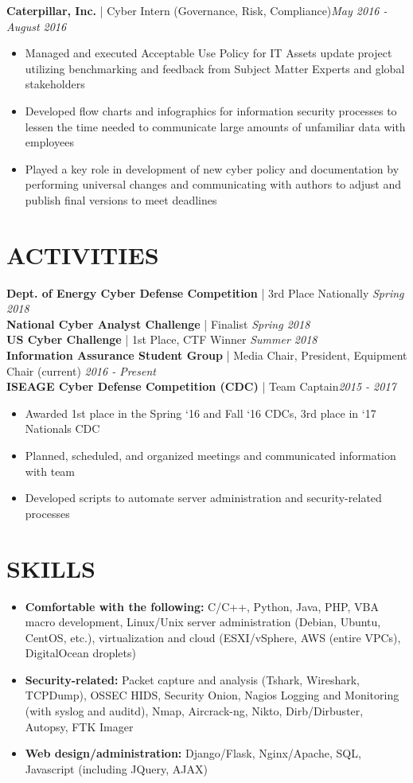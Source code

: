 \documentclass[line]{res}
\begin{document}
\begin{resume}
\textbf{Caterpillar, Inc.} | Cyber Intern (Governance, Risk, Compliance)\hfill \textit{May 2016 - August 2016}
\begin{itemize}
	\item Managed and executed Acceptable Use Policy for IT Assets update project utilizing benchmarking and feedback from Subject Matter Experts and global stakeholders
	\item Developed flow charts and infographics for information security processes to lessen the time needed to communicate large amounts of unfamiliar data with employees
	\item Played a key role in development of new cyber policy and documentation by performing universal changes and communicating with authors to adjust and publish final versions to meet deadlines
\end{itemize}

\section{ACTIVITIES}
\textbf{Dept. of Energy Cyber Defense Competition} | 3rd Place Nationally \hfill \textit{Spring 2018}\\
\textbf{National Cyber Analyst Challenge} | Finalist \hfill \textit{Spring 2018}\\
\textbf{US Cyber Challenge} | 1st Place, CTF Winner \hfill \textit{Summer 2018}\\
\textbf{Information Assurance Student Group} | Media Chair, President, Equipment Chair (current) \hfill \textit{2016 - Present}\\
\textbf{ISEAGE Cyber Defense Competition (CDC)} | Team Captain\hfill \textit{2015 - 2017}
\begin{itemize}
	\item Awarded 1st place in the Spring ‘16 and Fall ‘16 CDCs, 3rd place in ‘17 Nationals CDC
	\item Planned, scheduled, and organized meetings and communicated information with team
	\item Developed scripts to automate server administration and security-related processes
\end{itemize}

\section{SKILLS}
\begin{itemize}
	\item \textbf{Comfortable with the following:} C/C++, Python, Java, PHP, VBA macro development, Linux/Unix server administration (Debian, Ubuntu, CentOS, etc.), virtualization and cloud (ESXI/vSphere, AWS (entire VPCs), DigitalOcean droplets)
	\item \textbf{Security-related:} Packet capture and analysis (Tshark, Wireshark, TCPDump), OSSEC HIDS, Security Onion, Nagios Logging and Monitoring (with syslog and auditd), Nmap, Aircrack-ng, Nikto, Dirb/Dirbuster, Autopsy, FTK Imager
	\item \textbf{Web design/administration:} Django/Flask, Nginx/Apache, SQL, Javascript (including JQuery, AJAX)
\end{itemize}

\end{resume}
\end{document}
